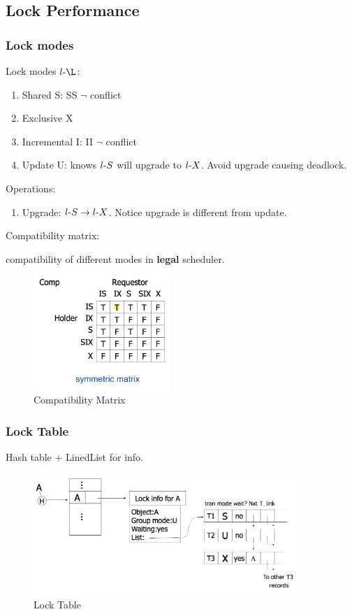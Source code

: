 \documentclass[a4paper]{report}
\begin{document}
\subsection{Lock Performance}
\subsubsection{Lock modes}
Lock modes $l\hp \L$:
\begin{enumerate}
\item Shared S: SS $\neg$ conflict 
\item Exclusive X
\item Incremental I: II $\neg$ conflict 
\item Update U: knows $l\text{-} S$ will upgrade to $l\text{-} X$. Avoid upgrade causing deadlock.
\end{enumerate}
Operations:
\begin{enumerate}
\item Upgrade: $l\text{-} S \rightarrow l\text{-} X$. Notice upgrade is different from update.
\end{enumerate}
Compatibility matrix: 

compatibility of different modes in \textbf{legal} scheduler.
\begin{figure}[H]
    \centerline{\includegraphics[height = 1.7in]{img/lockModes}}
    \caption{Compatibility Matrix}
  \label{fig:compatibilityMatrix}
\end{figure}

\subsubsection{Lock Table}
Hash table + LinedList for info.
\begin{figure}[H]
    \centerline{\includegraphics[height = 1.8in]{img/lockTable}}
    \caption{Lock Table}
  \label{fig:lockTable}
\end{figure}
\end{document}
